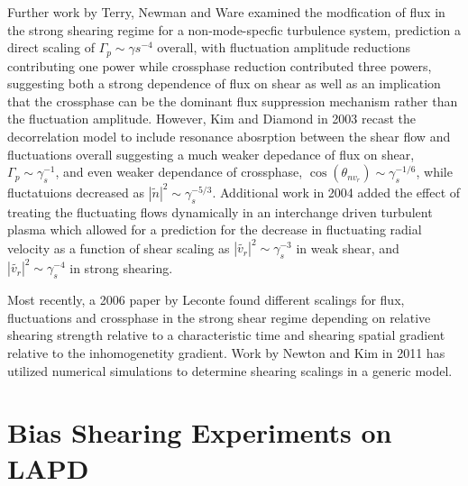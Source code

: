 \documentclass[aip,pop,amsmath,amssymb,reprint,superscriptaddress]{revtex4-1} %
\begin{document}
Further work by Terry, Newman and Ware examined the modfication of flux in the strong shearing regime for a non-mode-specfic turbulence system, prediction a direct scaling of $\Gamma_{p} \sim \gamma{s}^{-4}$ overall, with fluctuation amplitude reductions contributing one power while crossphase reduction contributed three powers, suggesting both a strong dependence of flux on shear as well as an implication that the crossphase can be the dominant flux suppression mechanism rather than the fluctuation amplitude. However, Kim and Diamond in 2003 recast the decorrelation model to include resonance abosrption between the shear flow and fluctuations overall suggesting a much weaker depedance of flux on shear,$\Gamma_{p} \sim \gamma_{s}^{-1}$, and even weaker dependance of crossphase, $\cos(\theta_{nv_{r}}) \sim \gamma_{s}^{-1/6}$, while fluctatuions decreased as $|\tilde{n}|^{2} \sim \gamma_{s}^{-5/3}$. Additional work in 2004 added the effect of treating the fluctuating flows dynamically in an interchange driven turbulent plasma which allowed for a prediction for the decrease in fluctuating radial velocity as a function of shear scaling as $|\tilde{v_{r}}|^{2} \sim \gamma_{s}^{-3}$ in weak shear, and $|\tilde{v_{r}}|^{2} \sim \gamma_{s}^{-4}$ in strong shearing.

Most recently, a 2006 paper by Leconte found different scalings for flux, fluctuations and crossphase in the strong shear regime depending on relative shearing strength relative to a characteristic time and shearing spatial gradient relative to the inhomogenetity gradient. Work by Newton and Kim in 2011 has utilized numerical simulations to determine shearing scalings in a generic model.

\section{Bias Shearing Experiments on LAPD}
\end{document}
